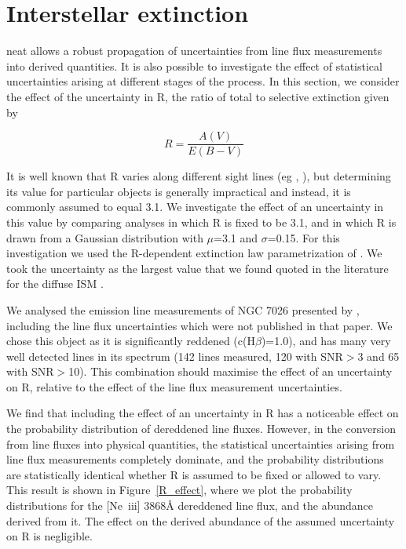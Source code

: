 \documentclass[useAMS,usenatbib]{mn2e}
\begin{document}
\section{Interstellar extinction}
\label{extinction}

{\sc neat} allows a robust propagation of uncertainties from line flux measurements into derived quantities.  It is also possible to investigate the effect of statistical uncertainties arising at different stages of the process.  In this section, we consider the effect of the uncertainty in R, the ratio of total to selective extinction given by

\begin{equation}
R = \frac{A(V)}{E(B-V)}
\end{equation}

It is well known that R varies along different sight lines (eg \citet{2004ApJ...616..912V}, \citet{2005ApJ...623..897L}), but determining its value for particular objects is generally impractical and instead, it is commonly assumed to equal 3.1.  We investigate the effect of an uncertainty in this value by comparing analyses in which R is fixed to be 3.1, and in which R is drawn from a Gaussian distribution with $\mu$=3.1 and $\sigma$=0.15.  For this investigation we used the R-dependent extinction law parametrization of \citet{1989ApJ...345..245C}.  We took the uncertainty as the largest value that we found quoted in the literature for the diffuse ISM \citep{2005ApJ...623..897L}.

We analysed the emission line measurements of NGC 7026 presented by \citet{2005MNRAS.362..424W}, including the line flux uncertainties which were not published in that paper.  We chose this object as it is significantly reddened (c(H$\beta$)=1.0), and has many very well detected lines in its spectrum (142 lines measured, 120 with SNR$>$3 and 65 with SNR$>$10).  This combination should maximise the effect of an uncertainty on R, relative to the effect of the line flux measurement uncertainties.

We find that including the effect of an uncertainty in R has a noticeable effect on the probability distribution of dereddened line fluxes.  However, in the conversion from line fluxes into physical quantities, the statistical uncertainties arising from line flux measurements completely dominate, and the probability distributions are statistically identical whether R is assumed to be fixed or allowed to vary.  This result is shown in Figure~\ref{R_effect}, where we plot the probability distributions for the [Ne~{\sc iii}] 3868{\AA} dereddened line flux, and the abundance derived from it.  The effect on the derived abundance of the assumed uncertainty on R is negligible.
\end{document}
